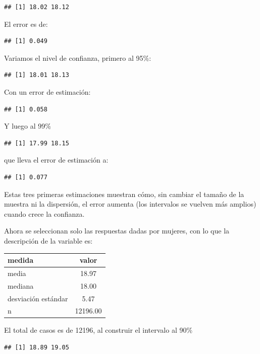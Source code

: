 \documentclass[]{book}
\begin{document}
\begin{verbatim}
## [1] 18.02 18.12
\end{verbatim}

El error es de:

\begin{verbatim}
## [1] 0.049
\end{verbatim}

Variamos el nivel de confianza, primero al 95\%:

\begin{verbatim}
## [1] 18.01 18.13
\end{verbatim}

Con un error de estimación:

\begin{verbatim}
## [1] 0.058
\end{verbatim}

Y luego al 99\%

\begin{verbatim}
## [1] 17.99 18.15
\end{verbatim}

que lleva el error de estimación a:

\begin{verbatim}
## [1] 0.077
\end{verbatim}

Estas tres primeras estimaciones muestran cómo, sin cambiar el tamaño de la muestra ni la dispersión, el error aumenta (los intervalos se vuelven más amplios) cuando crece la confianza.

Ahora se seleccionan solo las respuestas dadas por mujeres, con lo que la descripción de la variable es:

\begin{table}[H]
\centering
\begin{tabular}{lc}
\toprule
medida & valor\\
\midrule
\rowcolor{gray!6}  media & 18.97\\
mediana & 18.00\\
\rowcolor{gray!6}  desviación estándar & 5.47\\
n & 12196.00\\
\bottomrule
\end{tabular}
\end{table}

El total de casos es de 12196, al construir el intervalo al 90\%

\begin{verbatim}
## [1] 18.89 19.05
\end{verbatim}
\end{document}
